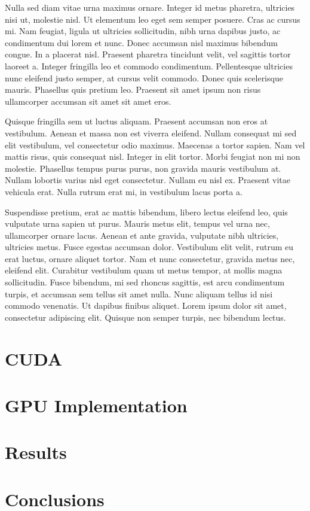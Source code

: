 \documentclass[a4paper,11pt]{kth-mag}
\begin{document}
Nulla sed diam vitae urna maximus ornare. Integer id metus pharetra, ultricies nisi ut, molestie nisl. Ut elementum leo eget sem semper posuere. Cras ac cursus mi. Nam feugiat, ligula ut ultricies sollicitudin, nibh urna dapibus justo, ac condimentum dui lorem et nunc. Donec accumsan nisl maximus bibendum congue. In a placerat nisl. Praesent pharetra tincidunt velit, vel sagittis tortor laoreet a. Integer fringilla leo et commodo condimentum. Pellentesque ultricies nunc eleifend justo semper, at cursus velit commodo. Donec quis scelerisque mauris. Phasellus quis pretium leo. Praesent sit amet ipsum non risus ullamcorper accumsan sit amet sit amet eros.

Quisque fringilla sem ut luctus aliquam. Praesent accumsan non eros at vestibulum. Aenean et massa non est viverra eleifend. Nullam consequat mi sed elit vestibulum, vel consectetur odio maximus. Maecenas a tortor sapien. Nam vel mattis risus, quis consequat nisl. Integer in elit tortor. Morbi feugiat non mi non molestie. Phasellus tempus purus purus, non gravida mauris vestibulum at. Nullam lobortis varius nisl eget consectetur. Nullam eu nisl ex. Praesent vitae vehicula erat. Nulla rutrum erat mi, in vestibulum lacus porta a.

Suspendisse pretium, erat ac mattis bibendum, libero lectus eleifend leo, quis vulputate urna sapien ut purus. Mauris metus elit, tempus vel urna nec, ullamcorper ornare lacus. Aenean et ante gravida, vulputate nibh ultricies, ultricies metus. Fusce egestas accumsan dolor. Vestibulum elit velit, rutrum eu erat luctus, ornare aliquet tortor. Nam et nunc consectetur, gravida metus nec, eleifend elit. Curabitur vestibulum quam ut metus tempor, at mollis magna sollicitudin. Fusce bibendum, mi sed rhoncus sagittis, est arcu condimentum turpis, et accumsan sem tellus sit amet nulla. Nunc aliquam tellus id nisi commodo venenatis. Ut dapibus finibus aliquet. Lorem ipsum dolor sit amet, consectetur adipiscing elit. Quisque non semper turpis, nec bibendum lectus.

\chapter{CUDA}
\chapter{GPU Implementation}
\chapter{Results}



\chapter{Conclusions}

\appendix
\addappheadtotoc
\end{document}
